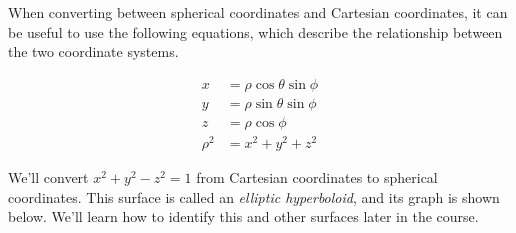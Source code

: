 \documentclass{ximera}
\begin{document}
When converting between spherical coordinates and Cartesian coordinates, it can be useful to use the following equations, which describe the relationship between the two coordinate systems.

\begin{align*}
x &= \rho\cos\theta\sin\phi\\
y &= \rho\sin\theta\sin\phi\\
z &= \rho\cos\phi\\
\rho^2 &= x^2 + y^2 + z^2
\end{align*}

\begin{example}
We'll convert $x^2 + y^2 - z^2 = 1$ from Cartesian coordinates to spherical coordinates. This surface is called an \emph{elliptic hyperboloid}, and its graph is shown below. We'll learn how to identify this and other surfaces later in the course.

\begin{image}
\end{image}


\end{example}
\end{document}

